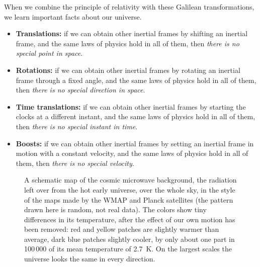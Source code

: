 \documentclass[11pt,a4paper]{article}
\begin{document}
When we combine the principle of relativity with these Galilean transformations, we learn important
facts about our universe.
\begin{itemize}
  \item \textbf{Translations:} if we can obtain other inertial frames by shifting an inertial
    frame, and the same laws of physics hold in all of them, then \emph{there is no special point
    in space}.
  \item \textbf{Rotations:} if we can obtain other inertial frames by rotating an inertial frame
    through a fixed angle, and the same laws of physics hold in all of them, then \emph{there is
    no special direction in space}.
  \item \textbf{Time translations:} if we can obtain other inertial frames by starting the clocks
    at a different instant, and the same laws of physics hold in all of them, then \emph{there is
    no special instant in time}.
  \item \textbf{Boosts:} if we can obtain other inertial frames by setting an inertial frame in
    motion with a constant velocity, and the same laws of physics hold in all of them, then
    \emph{there is no special velocity}.
\end{itemize}

\begin{figure}[ht]
\centering
\caption{A schematic map of the cosmic microwave background, the radiation left over from the hot
early universe, over the whole sky, in the style of the maps made by the WMAP and Planck
satellites (the pattern drawn here is random, not real data). The colors show tiny differences in
its temperature, after the effect of our own motion has been removed: red and yellow patches are slightly warmer than average, dark blue patches
slightly cooler, by only about one part in 100\,000 of its mean temperature of \qty{2.7}{K}. On the
largest scales the universe looks the same in every direction.}\label{fig:cmb}
\end{figure}
\end{document}
